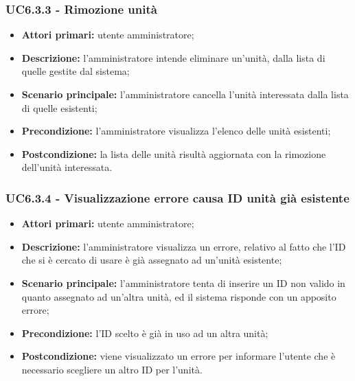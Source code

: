 \subsubsection{UC6.3.3 - Rimozione unità}
\begin{itemize}
	\item \textbf{Attori primari:} utente amministratore;
	\item \textbf{Descrizione:} l'amministratore intende eliminare un'unità, dalla lista di quelle gestite dal sistema;
	\item \textbf{Scenario principale:} l'amministratore cancella l'unità interessata dalla lista di quelle esistenti;
	\item \textbf{Precondizione:} l'amministratore visualizza l'elenco delle unità esistenti;
	\item \textbf{Postcondizione:} la lista delle unità risultà aggiornata con la rimozione dell'unità interessata.
\end{itemize}

\subsubsection{UC6.3.4 - Visualizzazione errore causa ID unità già esistente}
\begin{itemize}
	\item \textbf{Attori primari:} utente amministratore;
	\item \textbf{Descrizione:} l'amministratore visualizza un errore, relativo al fatto che l'ID che si è cercato di usare è già assegnato ad un'unità esistente;
	\item \textbf{Scenario principale:} l'amministratore tenta di inserire un ID non valido in quanto assegnato ad un'altra unità, ed il sistema risponde con un apposito errore;
	\item \textbf{Precondizione:} l'ID scelto è già in uso ad un altra unità;
	\item \textbf{Postcondizione:} viene visualizzato un errore per informare l'utente che è necessario scegliere un altro ID per l'unità.
\end{itemize}